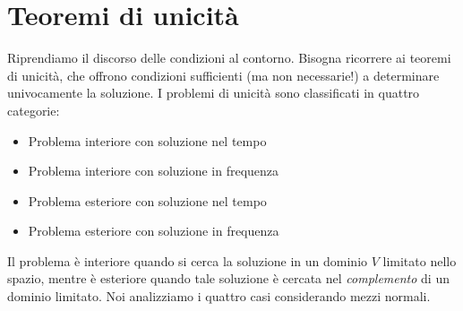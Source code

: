 \documentclass{book}
\begin{document}
    \section{Teoremi di unicità}
        Riprendiamo il discorso delle condizioni al contorno. Bisogna ricorrere ai teoremi di unicità, che offrono condizioni sufficienti (ma non necessarie!) a determinare univocamente la soluzione. I problemi di unicità sono classificati in quattro categorie:
        \begin{itemize}
            \item Problema interiore con soluzione nel tempo 
            \item Problema interiore con soluzione in frequenza
            
            \item Problema esteriore con soluzione nel tempo 
            \item Problema esteriore con soluzione in frequenza
        \end{itemize}
        Il problema è interiore quando si cerca la soluzione in un dominio $V$ limitato nello spazio, mentre è esteriore quando tale soluzione è cercata nel \textit{complemento} di un dominio limitato. Noi analizziamo i quattro casi considerando mezzi normali.
\end{document}
